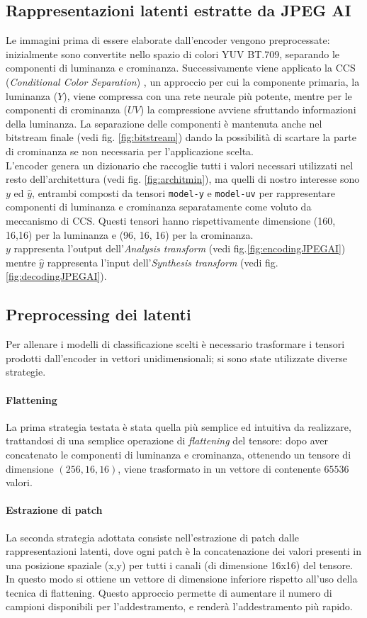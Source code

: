 \subsection{Rappresentazioni latenti estratte da JPEG AI}\label{subsec:latenti}
Le immagini prima di essere elaborate dall'encoder vengono preprocessate: inizialmente sono convertite nello spazio di colori YUV BT.709, separando le componenti di luminanza e crominanza. Successivamente viene applicato la CCS (\textit{Conditional Color Separation}) \cite{10018070}, un approccio per cui la componente primaria, la luminanza ($Y$), viene compressa con una rete neurale più potente, mentre per le componenti di crominanza ($UV$) la compressione avviene sfruttando informazioni della luminanza.
La separazione delle componenti è mantenuta anche nel bitstream finale (vedi fig. \ref{fig:bitstream}) dando la possibilità di scartare la parte di crominanza se non necessaria per l'applicazione scelta.\\
L'encoder genera un dizionario che raccoglie tutti i valori necessari utilizzati nel resto dell'architettura (vedi fig. \ref{fig:architmin}), ma quelli di nostro interesse sono $y$ ed $\hat{y}$, entrambi composti da tensori \texttt{model-y} e \texttt{model-uv} per rappresentare componenti di luminanza e crominanza separatamente come voluto da meccanismo di CCS. Questi tensori hanno rispettivamente dimensione (160, 16,16) per la luminanza e (96, 16, 16) per la crominanza.\\
$y$ rappresenta l'output dell'\textit{Analysis transform} (vedi fig.\ref{fig:encodingJPEGAI}) mentre $\hat{y}$ rappresenta l'input dell'\textit{Synthesis transform} (vedi fig. \ref{fig:decodingJPEGAI}).
\subsection{Preprocessing dei latenti}\label{sec:preprocessing}
Per allenare i modelli di classificazione scelti è necessario trasformare i tensori prodotti dall'encoder in vettori unidimensionali; si sono state utilizzate diverse strategie.
\paragraph{Flattening} La prima strategia testata è stata quella più semplice ed intuitiva da realizzare, trattandosi di una semplice operazione di \textit{flattening} del tensore: dopo aver concatenato le componenti di luminanza e crominanza, ottenendo un tensore di dimensione $(256, 16, 16)$, viene trasformato in un vettore di contenente $65536$ valori.
\paragraph{Estrazione di patch} La seconda strategia adottata consiste nell'estrazione di patch dalle rappresentazioni latenti, dove ogni patch è la concatenazione dei valori presenti in una posizione spaziale (x,y) per tutti i canali (di dimensione 16x16) del tensore. In questo modo si ottiene un vettore di dimensione inferiore rispetto all'uso della tecnica di flattening. Questo approccio permette di aumentare il numero di campioni disponibili per l'addestramento, e renderà l'addestramento più rapido.
